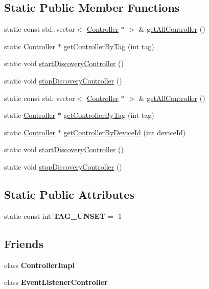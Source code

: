 \subsection*{Static Public Member Functions}
\begin{DoxyCompactItemize}
\item 
static const std\+::vector$<$ \hyperlink{classController}{Controller} $\ast$ $>$ \& \hyperlink{classController_a5fc9812dfd76de7a0457589035472575}{get\+All\+Controller} ()
\item 
static \hyperlink{classController}{Controller} $\ast$ \hyperlink{classController_ad058b420928dce690a9274a53ddfb04d}{get\+Controller\+By\+Tag} (int tag)
\item 
static void \hyperlink{classController_abd0fe19473c8bcabfe32318c4cc86f1e}{start\+Discovery\+Controller} ()
\item 
static void \hyperlink{classController_a56e523730da3b75bed4597ef87ec0495}{stop\+Discovery\+Controller} ()
\item 
static const std\+::vector$<$ \hyperlink{classController}{Controller} $\ast$ $>$ \& \hyperlink{classController_a5fc9812dfd76de7a0457589035472575}{get\+All\+Controller} ()
\item 
static \hyperlink{classController}{Controller} $\ast$ \hyperlink{classController_ac2fe9d842f17b076d3610ce08ec93334}{get\+Controller\+By\+Tag} (int tag)
\item 
static \hyperlink{classController}{Controller} $\ast$ \hyperlink{classController_a51b65b0165848b09f427825f96a85fa0}{get\+Controller\+By\+Device\+Id} (int device\+Id)
\item 
static void \hyperlink{classController_aeb4fe47c1de370d6ff5776147839234e}{start\+Discovery\+Controller} ()
\item 
static void \hyperlink{classController_a525207ef12be4dfa7ca89461c20db976}{stop\+Discovery\+Controller} ()
\end{DoxyCompactItemize}
\subsection*{Static Public Attributes}
\begin{DoxyCompactItemize}
\item 
\mbox{\label{classController_a62463a6698cdf66527d1b63fb27b1479}} 
static const int {\bfseries T\+A\+G\+\_\+\+U\+N\+S\+ET} = -\/1
\end{DoxyCompactItemize}
\subsection*{Friends}
\begin{DoxyCompactItemize}
\item 
\mbox{\label{classController_ac25e7836741da6200dc565af53a473f2}} 
class {\bfseries Controller\+Impl}
\item 
\mbox{\label{classController_a3ab82ca48d2c710a4cd1818d0f378223}} 
class {\bfseries Event\+Listener\+Controller}
\end{DoxyCompactItemize}


